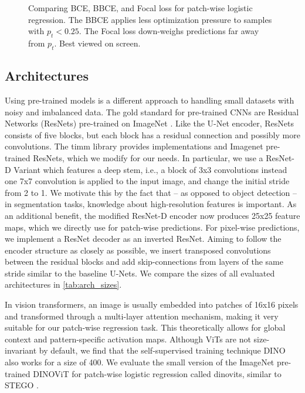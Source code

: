 \documentclass[10pt,conference,compsocconf]{IEEEtran}
\begin{document}
\begin{figure}[ht!]
\begin{subfigure}{0.324\columnwidth}
    \end{subfigure}
    \caption{Comparing BCE, BBCE, and Focal loss for patch-wise logistic regression. The BBCE applies less optimization pressure to samples with $p_t < 0.25$. The Focal loss down-weighs predictions far away from $p_t$. Best viewed on screen.}
    \label{fig:losses}
\end{figure}

\subsection{Architectures}
Using pre-trained models is a different approach to handling small datasets with noisy and imbalanced data. The gold standard for pre-trained CNNs are Residual Networks (ResNets) \cite{resnet} pre-trained on ImageNet \cite{imagenet}. Like the U-Net encoder, ResNets consists of five blocks, but each block has a residual connection and possibly more convolutions. The timm library \cite{timm} provides implementations and Imagenet pre-trained ResNets, which we modify for our needs. In particular, we use a ResNet-D Variant \cite{resnet-tricks} which features a deep stem, i.e., a block of 3x3 convolutions instead one 7x7 convolution is applied to the input image, and change the initial stride from 2 to 1. We motivate this by the fact that -- as opposed to object detection -- in segmentation tasks, knowledge about high-resolution features is important. As an additional benefit, the modified ResNet-D encoder now produces 25x25 feature maps, which we directly use for patch-wise predictions. For pixel-wise predictions, we implement a ResNet decoder as an inverted ResNet. Aiming to follow the encoder structure as closely as possible, we insert transposed convolutions between the residual blocks and add skip-connections from layers of the same stride similar to the baseline U-Nets. We compare the sizes of all evaluated architectures in \autoref{tab:arch_sizes}.

In vision transformers, an image is usually embedded into patches of 16x16 pixels and transformed through a multi-layer attention mechanism, making it very suitable for our patch-wise regression task. This theoretically allows for global context and pattern-specific activation maps. Although ViTs are not size-invariant by default, we find that the self-supervised training technique DINO \cite{dino} also works for a size of 400. We evaluate the small version of the ImageNet pre-trained DINOViT for patch-wise logistic regression called dinovits, similar to STEGO \cite{stego}.
\end{document}
